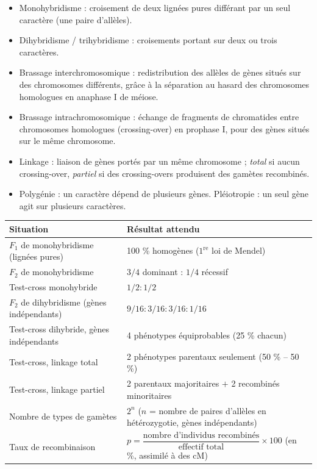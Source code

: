 \documentclass[11pt]{article}
\newcommand{\cle}[1]{{\popxbold\color{popdark}#1}}
\begin{document}
\begin{aretenir}
\begin{itemize}
  \item \cle{Monohybridisme} : croisement de deux lignées pures différant par un seul caractère (une paire d'allèles).
  \item \cle{Dihybridisme} / \cle{trihybridisme} : croisements portant sur deux ou trois caractères.
  \item \cle{Brassage interchromosomique} : redistribution des allèles de gènes situés sur des chromosomes différents, grâce à la séparation au hasard des chromosomes homologues en anaphase I de méiose.
  \item \cle{Brassage intrachromosomique} : échange de fragments de chromatides entre chromosomes homologues (\cle{crossing-over}) en prophase I, pour des gènes situés sur le même chromosome.
  \item \cle{Linkage} : liaison de gènes portés par un même chromosome ; \emph{total} si aucun crossing-over, \emph{partiel} si des crossing-overs produisent des gamètes recombinés.
  \item \cle{Polygénie} : un caractère dépend de plusieurs gènes. \cle{Pléiotropie} : un seul gène agit sur plusieurs caractères.
\end{itemize}
\end{aretenir}

\begin{propriete}
\begin{center}
\begin{tabularx}{\linewidth}{|l|X|}
\hline
\rowcolor{popblueL} \textbf{Situation} & \textbf{Résultat attendu} \\
\hline
$F_1$ de monohybridisme (lignées pures) & 100 \% homogènes ($1^{\text{re}}$ loi de Mendel) \\
\hline
$F_2$ de monohybridisme & $3/4$ dominant : $1/4$ récessif \\
\hline
Test-cross monohybride & $1/2 : 1/2$ \\
\hline
$F_2$ de dihybridisme (gènes indépendants) & $9/16 : 3/16 : 3/16 : 1/16$ \\
\hline
Test-cross dihybride, gènes indépendants & 4 phénotypes équiprobables (25 \% chacun) \\
\hline
Test-cross, linkage total & 2 phénotypes parentaux seulement (50 \% -- 50 \%) \\
\hline
Test-cross, linkage partiel & 2 parentaux majoritaires $+$ 2 recombinés minoritaires \\
\hline
Nombre de types de gamètes & $2^n$ ($n$ = nombre de paires d'allèles en hétérozygotie, gènes indépendants) \\
\hline
Taux de recombinaison & $p = \dfrac{\text{nombre d'individus recombinés}}{\text{effectif total}} \times 100$ (en \%, assimilé à des cM) \\
\hline
\end{tabularx}
\end{center}
\end{propriete}
\end{document}
